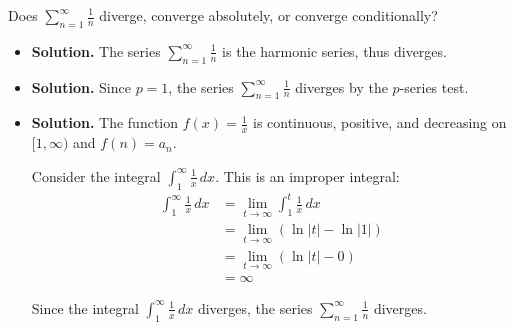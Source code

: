 \documentclass{article}
\begin{document}
\noindent
Does $\displaystyle \sum_{n=1}^\infty \frac1n$
diverge, converge absolutely, or converge conditionally?

\begin{itemize}

\item {\bf Solution.} The series $\displaystyle \sum_{n=1}^\infty \frac1n$ is the harmonic series, thus diverges.

\item {\bf Solution.} Since $p=1$, the series $\displaystyle \sum_{n=1}^\infty \frac1n$ 
diverges by the $p$-series test.

\item {\bf Solution.} The function $f(x) = \frac1x$ is continuous, positive, and decreasing on $[1,\infty)$ and $f(n)=a_n$.

Consider the integral $\displaystyle \int_1^\infty \frac1x\,dx$.
This is an improper integral:
\begin{align*}
\int_1^\infty \frac1x\,dx
&= \lim_{t \rightarrow \infty} \int_1^t \frac1x\,dx\\
&= \lim_{t \rightarrow \infty} (\ln |t| - \ln |1|)\\
&= \lim_{t \rightarrow \infty} (\ln |t| - 0)\\
&= \infty
\end{align*}

Since the integral  $\displaystyle \int_1^\infty \frac1x\,dx$ diverges, the series $\displaystyle \sum_{n=1}^\infty \frac1n$ diverges.

\end{itemize}
\end{document}
